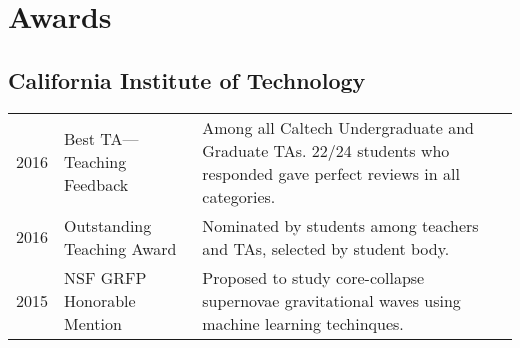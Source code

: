 \documentclass[]{yubo-resume-openfont}
\begin{document}
\begin{minipage}[t]{0.66\textwidth}

\section{Awards}
\subsection{California Institute of Technology}
\begin{tabular}{p{20pt}p{80pt}p{7.5cm}}
    2016 & Best TA---Teaching Feedback & Among all Caltech Undergraduate and
    Graduate TAs. 22/24 students who responded gave perfect reviews in all
    categories.\\
    2016 & Outstanding Teaching Award & Nominated by students among teachers and
    TAs, selected by student body.\\
    2015 & NSF GRFP Honorable Mention & Proposed to study core-collapse
    supernovae gravitational waves using machine learning techinques.
\end{tabular}
\sectionsep

\end{minipage}
\end{document}
